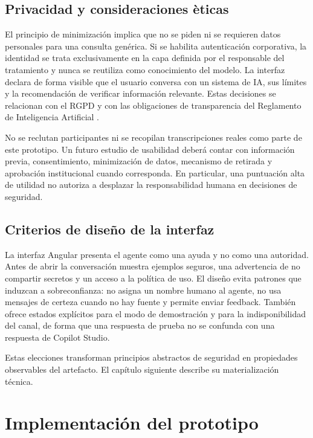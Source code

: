 \documentclass[12pt,twoside,titlepage]{book}
\begin{document}
\section{Privacidad y consideraciones \`eticas}

El principio de minimizaci\'on implica que no se piden ni se requieren datos personales para una consulta gen\'erica. Si se habilita autenticaci\'on corporativa, la identidad se trata exclusivamente en la capa definida por el responsable del tratamiento y nunca se reutiliza como conocimiento del modelo. La interfaz declara de forma visible que el usuario conversa con un sistema de IA, sus l\'imites y la recomendaci\'on de verificar informaci\'on relevante. Estas decisiones se relacionan con el RGPD \cite{gdpr} y con las obligaciones de transparencia del Reglamento de Inteligencia Artificial \cite{aiAct}.

No se reclutan participantes ni se recopilan transcripciones reales como parte de este prototipo. Un futuro estudio de usabilidad deber\'a contar con informaci\'on previa, consentimiento, minimizaci\'on de datos, mecanismo de retirada y aprobaci\'on institucional cuando corresponda. En particular, una puntuaci\'on alta de utilidad no autoriza a desplazar la responsabilidad humana en decisiones de seguridad.

\section{Criterios de dise\~no de la interfaz}

La interfaz Angular presenta el agente como una ayuda y no como una autoridad. Antes de abrir la conversaci\'on muestra ejemplos seguros, una advertencia de no compartir secretos y un acceso a la pol\'itica de uso. El dise\~no evita patrones que induzcan a sobreconfianza: no asigna un nombre humano al agente, no usa mensajes de certeza cuando no hay fuente y permite enviar feedback. Tambi\'en ofrece estados expl\'icitos para el modo de demostraci\'on y para la indisponibilidad del canal, de forma que una respuesta de prueba no se confunda con una respuesta de Copilot Studio.

Estas elecciones transforman principios abstractos de seguridad en propiedades observables del artefacto. El cap\'itulo siguiente describe su materializaci\'on t\'ecnica.



\chapter{Implementaci\'on del prototipo}
\label{chap:implementacion}
\end{document}
